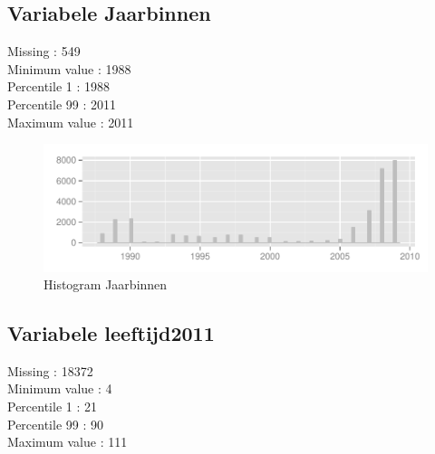 \documentclass[10pt,a4paper,titlepage]{report}
\begin{document}

\subsection{Variabele Jaarbinnen}

Missing :  549 \\
Minimum value : 1988\\
Percentile 1 : 1988\\
Percentile 99 : 2011\\
Maximum value : 2011

\color{red}


\color{black}

\begin{figure}[H]
   \centering
\begin{knitrout}
\color{fgcolor}\begin{kframe}


{\ttfamily\noindent\color{warningcolor}{\#\# Warning: position\_stack requires constant width: output may be incorrect}}\end{kframe}
\includegraphics[width=\maxwidth]{figure/unnamed-chunk-20} 

\end{knitrout}

    \caption{Histogram Jaarbinnen}
    \label{fig:figPlot10}
\end{figure}


\subsection{Variabele leeftijd2011}

Missing :  18372 \\
Minimum value : 4\\
Percentile 1 : 21\\
Percentile 99 : 90\\
Maximum value : 111
\end{document}
